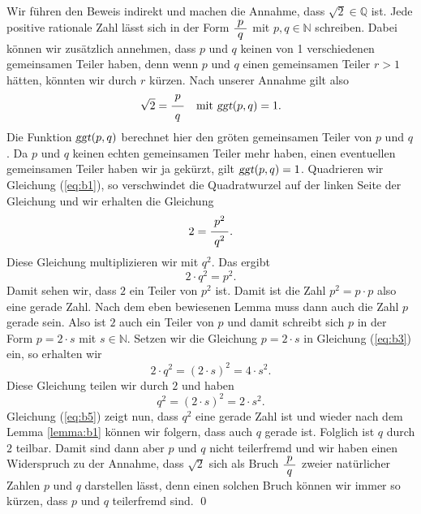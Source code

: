 \proof
Wir f\"{u}hren den Beweis indirekt und machen die Annahme, dass $\sqrt{2} \in \mathbb{Q}$ ist.  Jede positive
rationale Zahl l\"{a}sst sich in der Form $\bruch{p}{q}$ mit $p,q \in \mathbb{N}$ schreiben.  Dabei k\"{o}nnen
wir zus\"{a}tzlich annehmen, dass  $p$ und $q$ keinen von 1 verschiedenen gemeinsamen Teiler haben, denn
wenn $p$ und $q$ einen gemeinsamen Teiler $r > 1$ h\"{a}tten, k\"{o}nnten wir durch $r$ k\"{u}rzen.  Nach unserer 
Annahme gilt also
\begin{equation}
  \label{eq:b1}
  \sqrt{2} = \bruch{p}{q} \quad \mbox{mit $\textsl{ggt}(p,q) = 1$}.
\end{equation}
Die Funktion $\textsl{ggt}(p,q)$ berechnet hier den gr\"{o}\3ten gemeinsamen Teiler von $p$ und $q$.   
Da $p$ und $q$ keinen echten gemeinsamen Teiler mehr haben, einen eventuellen gemeinsamen Teiler
haben wir ja gek\"{u}rzt, gilt $\textsl{ggt}(p, q) = 1$.  Quadrieren wir  Gleichung (\ref{eq:b1}), so
verschwindet die Quadratwurzel auf der linken Seite der Gleichung und wir erhalten die Gleichung
\begin{equation}
  \label{eq:b2}
  2 = \bruch{p^2}{q^2}.
\end{equation}
Diese Gleichung multiplizieren wir mit $q^2$.  Das ergibt
\begin{equation}
  \label{eq:b3}
  2 \cdot q^2 = p^2.
\end{equation}
Damit sehen wir, dass $2$ ein Teiler von $p^2$ ist.  Damit ist die Zahl $p^2 = p \cdot p$ also eine gerade Zahl.
Nach dem eben bewiesenen Lemma muss dann auch die Zahl $p$ gerade sein.
Also ist $2$ auch ein Teiler von $p$ und damit schreibt sich $p$ in der Form $p = 2 \cdot s$ mit $s
\in \mathbb{N}$.  Setzen 
wir die Gleichung $p = 2 \cdot s$ in Gleichung (\ref{eq:b3}) ein, so erhalten wir 
\begin{equation}
  \label{eq:b4}
  2 \cdot q^2 = (2 \cdot s)^2 = 4 \cdot s^2.
\end{equation}
Diese Gleichung teilen wir durch $2$ und haben
\begin{equation}
  \label{eq:b5}
  q^2 = (2 \cdot s)^2 = 2 \cdot s^2.
\end{equation}
Gleichung (\ref{eq:b5}) zeigt nun, dass $q^2$ eine gerade Zahl ist und wieder nach dem Lemma
\ref{lemma:b1} k\"{o}nnen wir folgern, dass auch  $q$ gerade ist.  Folglich ist $q$ durch $2$ teilbar.
Damit sind dann aber $p$ und $q$ nicht teilerfremd und wir haben einen Widerspruch zu der
Annahme, dass $\sqrt{2}$ sich als Bruch $\bruch{p}{q}$ zweier nat\"{u}rlicher Zahlen $p$ und $q$
darstellen l\"{a}sst, denn einen solchen Bruch k\"{o}nnen wir immer so k\"{u}rzen, dass $p$ und $q$ teilerfremd
sind. 
\qed



